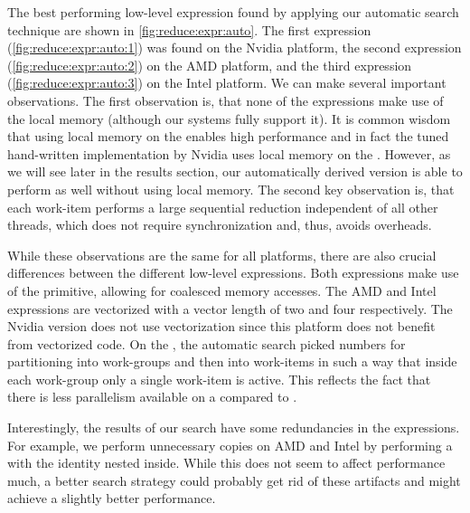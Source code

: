 The best performing low-level expression found by applying our automatic search technique are shown in \autoref{fig:reduce:expr:auto}.
The first expression (\autoref{fig:reduce:expr:auto:1}) was found on the Nvidia platform, the second expression (\autoref{fig:reduce:expr:auto:2}) on the AMD platform, and the third expression (\autoref{fig:reduce:expr:auto:3}) on the Intel platform.
We can make several important observations.
The first observation is, that none of the expressions make use of the local memory (although our systems fully support it).
It is common wisdom that using local memory on the \GPU enables high performance and in fact the tuned hand-written implementation by Nvidia uses local memory on the \GPU.
However, as we will see later in the results section, our automatically derived version is able to perform as well without using local memory.
The second key observation is, that each work-item performs a large sequential reduction independent of all other threads, which does not require synchronization and, thus, avoids overheads.

While these observations are the same for all platforms, there are also crucial differences between the different low-level expressions.
Both \GPU expressions make use of the \reorderStride primitive, allowing for coalesced memory accesses.
The AMD and Intel expressions are vectorized with a vector length of two and four respectively.
The Nvidia version does not use vectorization since this platform does not benefit from vectorized code.
On the \CPU, the automatic search picked numbers for partitioning into work-groups and then into work-items in such a way that inside each work-group only a single work-item is active.
This reflects the fact that there is less parallelism available on a \CPU compared to \GPUs.

Interestingly, the results of our search have some redundancies in the expressions.
For example, we perform unnecessary copies on AMD and Intel by performing a \mapSeq with the identity nested inside.
While this does not seem to affect performance much, a better search strategy could probably get rid of these artifacts and might achieve a slightly better performance.


